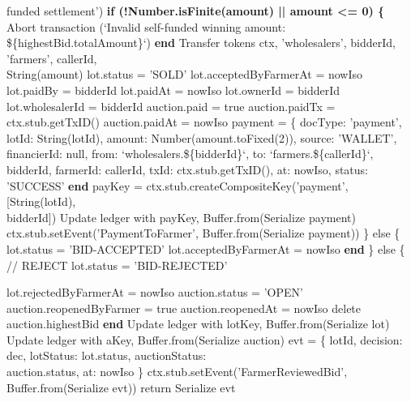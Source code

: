\documentclass[12pt]{article}
\begin{document}
\begin{algorithm}[H]
\caption{farmerReviewBidForLot() (Part 2 of 3)}
\quad funded settlement')\;
\textbf{if (!Number.isFinite(amount) || amount <= 0) \{}\;
Abort transaction (`Invalid self-funded winning amount:\\
\quad \$\{highestBid.totalAmount\}`)\;
\textbf{end}\;
Transfer tokens ctx, 'wholesalers', bidderId, 'farmers', callerId,\\
\quad String(amount)\;
lot.status = 'SOLD'\;
lot.acceptedByFarmerAt = nowIso\;
lot.paidBy = bidderId\;
lot.paidAt = nowIso\;
lot.ownerId = bidderId\;
lot.wholesalerId = bidderId\;
auction.paid = true\;
auction.paidTx = ctx.stub.getTxID()\;
auction.paidAt = nowIso\;
payment = \{\;
docType: 'payment',\;
lotId: String(lotId),\;
amount: Number(amount.toFixed(2)),\;
source: 'WALLET',\;
financierId: null,\;
from: `wholesalers.\$\{bidderId\}`,\;
to: `farmers.\$\{callerId\}`,\;
bidderId,\;
farmerId: callerId,\;
txId: ctx.stub.getTxID(),\;
at: nowIso,\;
status: 'SUCCESS'\;
\textbf{end}\;
payKey = ctx.stub.createCompositeKey('payment', [String(lotId),\\
\quad bidderId])\;
Update ledger with payKey, Buffer.from(Serialize payment)\;
ctx.stub.setEvent('PaymentToFarmer', Buffer.from(Serialize payment))\;
\} else \{\;
lot.status = 'BID-ACCEPTED'\;
lot.acceptedByFarmerAt = nowIso\;
\textbf{end}\;
\} else \{ // REJECT\;
lot.status = 'BID-REJECTED'\;
\end{algorithm}


\begin{algorithm}[H]
\caption{farmerReviewBidForLot() (Part 3 of 3)}
lot.rejectedByFarmerAt = nowIso\;
auction.status = 'OPEN'\;
auction.reopenedByFarmer = true\;
auction.reopenedAt = nowIso\;
delete auction.highestBid\;
\textbf{end}\;
Update ledger with lotKey, Buffer.from(Serialize lot)\;
Update ledger with aKey, Buffer.from(Serialize auction)\;
evt = \{ lotId, decision: dec, lotStatus: lot.status, auctionStatus:\\
\quad auction.status, at: nowIso \}\;
ctx.stub.setEvent('FarmerReviewedBid', Buffer.from(Serialize evt))\;
return Serialize evt\;
\end{algorithm}
\end{document}
